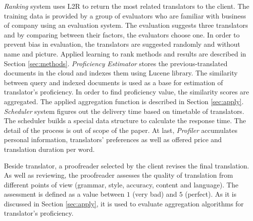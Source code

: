 \textit{Ranking} system uses L2R to return the most related translators to the client. The training data is provided by a group of evaluators who are familiar with business of company using an evaluation system. The evaluation suggests three translators and by comparing between their factors, the evaluators choose one. In order to prevent bias in evaluation, the translators are suggested randomly and without name and picture. Applied learning to rank methods and results are described in Section \ref{sec:methods}. \textit{Proficiency Estimator} stores the previous-translated documents in the cloud and indexes them using Lucene library. The similarity between query and indexed documents is used as a base for estimation of translator's proficiency. In order to find proficiency value, the similarity scores are aggregated. The applied aggregation function is described in Section \ref{sec:apply}. \textit{Scheduler} system figures out the delivery time based on timetable of translators. The scheduler builds a special data structure to calculate the response time. The detail of the process is out of scope of the paper. At last, \textit{Profiler} accumulates personal information, translators' preferences as well as offered price and translation duration per word.

Beside translator, a proofreader selected by the client revises the final translation. As well as reviewing, the proofreader assesses the quality of translation from different points of view (grammar, style, accuracy, content and language). The assessment is defined as a value between $1$ (very bad) and $5$ (perfect). As it is discussed in Section \ref{sec:apply}, it is used to evaluate aggregation algorithms for translator's proficiency.
